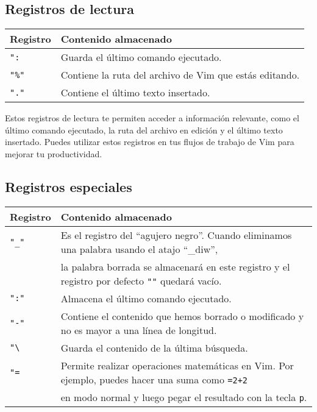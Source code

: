 \documentclass[
  doc,
  floatsintext,
  longtable,
  a4paper,
  nolmodern,
  notxfonts,
  notimes,
  colorlinks=true,linkcolor=blue,citecolor=blue,urlcolor=blue]{apa7}
\begin{document}
\subsection{Registros de lectura}\label{registros-de-lectura}

\begin{longtable}[]{@{}ll@{}}
\toprule\noalign{}
Registro & Contenido almacenado \\
\midrule\noalign{}
\endhead
\bottomrule\noalign{}
\endlastfoot
\texttt{":} & Guarda el último comando ejecutado. \\
\texttt{"\%"} & Contiene la ruta del archivo de Vim que estás
editando. \\
\texttt{"."} & Contiene el último texto insertado. \\
\end{longtable}

Estos registros de lectura te permiten acceder a información relevante,
como el último comando ejecutado, la ruta del archivo en edición y el
último texto insertado. Puedes utilizar estos registros en tus flujos de
trabajo de Vim para mejorar tu productividad.

\subsection{Registros especiales}\label{registros-especiales}

\begin{longtable}[]{@{}
  >{\raggedright\arraybackslash}p{}
  >{\raggedright\arraybackslash}p{}@{}}
\toprule\noalign{}
\begin{minipage}[b]{\linewidth}\raggedright
Registro
\end{minipage} & \begin{minipage}[b]{\linewidth}\raggedright
Contenido almacenado
\end{minipage} \\
\midrule\noalign{}
\endhead
\bottomrule\noalign{}
\endlastfoot
\texttt{"\_"} & Es el registro del ``agujero negro''. Cuando eliminamos
una palabra usando el atajo ``\_diw'', \\
& la palabra borrada se almacenará en este registro y el registro por
defecto \texttt{""} quedará vacío. \\
\texttt{":"} & Almacena el último comando ejecutado. \\
\texttt{"-"} & Contiene el contenido que hemos borrado o modificado y no
es mayor a una línea de longitud. \\
\texttt{"\textbackslash{}} & Guarda el contenido de la última
búsqueda. \\
\texttt{"=} & Permite realizar operaciones matemáticas en Vim. Por
ejemplo, puedes hacer una suma como \texttt{=2+2} \\
& en modo normal y luego pegar el resultado con la tecla \texttt{p}. \\
\end{longtable}
\end{document}
